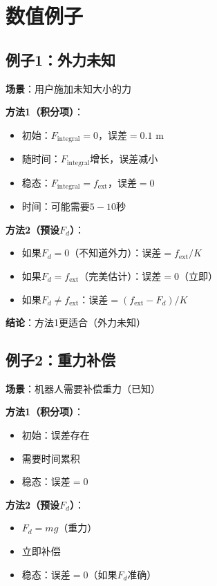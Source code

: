 \documentclass[12pt,a4paper]{article}
\begin{document}
\section{数值例子}

\subsection{例子1：外力未知}

\textbf{场景}：用户施加未知大小的力

\textbf{方法1（积分项）}：
\begin{itemize}
\item 初始：$F_{\text{integral}} = 0$，误差$= 0.1$ m
\item 随时间：$F_{\text{integral}}$增长，误差减小
\item 稳态：$F_{\text{integral}} = f_{\text{ext}}$，误差$= 0$
\item 时间：可能需要$5-10$秒
\end{itemize}

\textbf{方法2（预设$F_d$）}：
\begin{itemize}
\item 如果$F_d = 0$（不知道外力）：误差$= f_{\text{ext}}/K$
\item 如果$F_d = f_{\text{ext}}$（完美估计）：误差$= 0$（立即）
\item 如果$F_d \neq f_{\text{ext}}$：误差$= (f_{\text{ext}} - F_d)/K$
\end{itemize}

\textbf{结论}：方法1更适合（外力未知）

\subsection{例子2：重力补偿}

\textbf{场景}：机器人需要补偿重力（已知）

\textbf{方法1（积分项）}：
\begin{itemize}
\item 初始：误差存在
\item 需要时间累积
\item 稳态：误差$= 0$
\end{itemize}

\textbf{方法2（预设$F_d$）}：
\begin{itemize}
\item $F_d = mg$（重力）
\item 立即补偿
\item 稳态：误差$= 0$（如果$F_d$准确）
\end{itemize}
\end{document}
